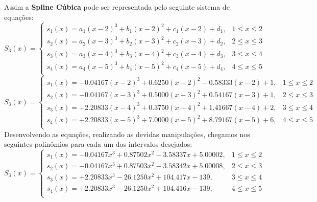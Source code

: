 \documentclass{article}
\begin{document}
            Assim a \textbf{Spline Cúbica} pode ser representada pelo seguinte sistema de equações:
                \[S_{3}(x) = 
                    \begin{cases}
                        s_{1}(x) = a_{1}(x - 2)^3 + b_{1}(x - 2)^2 + c_{1}(x - 2) + d_{1}, & 1 \leq x \leq 2\\
                        s_{2}(x) = a_{2}(x - 3)^3 + b_{2}(x - 3)^2 + c_{2}(x - 3) + d_{2}, & 2 \leq x \leq 3\\
                        s_{3}(x) = a_{3}(x - 4)^3 + b_{3}(x - 4)^2 + c_{3}(x - 4) + d_{3}, & 3 \leq x \leq 4\\
                        s_{4}(x) = a_{4}(x - 5)^3 + b_{4}(x - 5)^2 + c_{4}(x - 5) + d_{4}, & 4 \leq x \leq 5\\
                    \end{cases}
                \]
                \[S_{3}(x) = 
                    \begin{cases}
                        s_{1}(x) = -0.04167(x - 2)^3 + 0.6250(x - 2)^2 - 0.58333(x - 2) + 1, & 1 \leq x \leq 2\\
                        s_{2}(x) = -0.04167(x - 3)^3 + 0.5000(x - 3)^2 + 0.54167(x - 3) + 1, & 2 \leq x \leq 3\\
                        s_{3}(x) = +2.20833(x - 4)^3 + 0.3750(x - 4)^2 + 1.41667(x - 4) + 2, & 3 \leq x \leq 4\\
                        s_{4}(x) = +2.20833(x - 5)^3 + 7.0000(x - 5)^2 + 8.79167(x - 5) + 6, & 4 \leq x \leq 5\\
                    \end{cases}
                \]
            Desenvolvendo as equações, realizando as devidas manipulações, chegamos nos seguintes polinômios para cada um dos intervalos desejados:
                \[\boxed{S_{3}(x) = 
                    \begin{cases}
                        s_{1}(x) = - 0.04167 x^3 + 0.87502 x^2 - 3.58337x + 5.00002, & 1 \leq x \leq 2\\
                        s_{2}(x) = - 0.04167 x^3 + 0.87503 x^2 - 3.58342x + 5.00008, & 2 \leq x \leq 3\\
                        s_{3}(x) = + 2.20833 x^3 - 26.1250 x^2 + 104.417x - 139    , & 3 \leq x \leq 4\\
                        s_{4}(x) = + 2.20833 x^3 - 26.1250 x^2 + 104.416x - 139    , & 4 \leq x \leq 5\\
                    \end{cases}}
                \]
\end{document}
